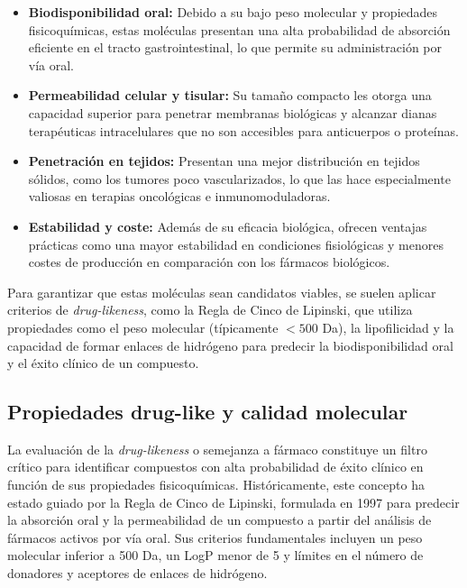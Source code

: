 \documentclass[IB]{TFUOC}%
\begin{document}
\begin{itemize}
    \item \textbf{Biodisponibilidad oral:} Debido a su bajo peso molecular y propiedades fisicoquímicas, estas moléculas presentan una alta probabilidad de absorción eficiente en el tracto gastrointestinal, lo que permite su administración por vía oral.
    
    \item \textbf{Permeabilidad celular y tisular:} Su tamaño compacto les otorga una capacidad superior para penetrar membranas biológicas y alcanzar dianas terapéuticas intracelulares que no son accesibles para anticuerpos o proteínas.
    
    \item \textbf{Penetración en tejidos:} Presentan una mejor distribución en tejidos sólidos, como los tumores poco vascularizados, lo que las hace especialmente valiosas en terapias oncológicas e inmunomoduladoras.
    
    \item \textbf{Estabilidad y coste:} Además de su eficacia biológica, ofrecen ventajas prácticas como una mayor estabilidad en condiciones fisiológicas y menores costes de producción en comparación con los fármacos biológicos.
\end{itemize}

Para garantizar que estas moléculas sean candidatos viables, se suelen aplicar criterios de \textit{drug-likeness}, como la Regla de Cinco de Lipinski, que utiliza propiedades como el peso molecular (típicamente $<500$ Da), la lipofilicidad y la capacidad de formar enlaces de hidrógeno para predecir la biodisponibilidad oral y el éxito clínico de un compuesto.

\subsection{Propiedades drug-like y calidad molecular}

La evaluación de la \textit{drug-likeness} o semejanza a fármaco constituye un filtro crítico para identificar compuestos con alta probabilidad de éxito clínico en función de sus propiedades fisicoquímicas. Históricamente, este concepto ha estado guiado por la Regla de Cinco de Lipinski, formulada en 1997 para predecir la absorción oral y la permeabilidad de un compuesto a partir del análisis de fármacos activos por vía oral. Sus criterios fundamentales incluyen un peso molecular inferior a 500 Da, un LogP menor de 5 y límites en el número de donadores y aceptores de enlaces de hidrógeno.
\end{document}

